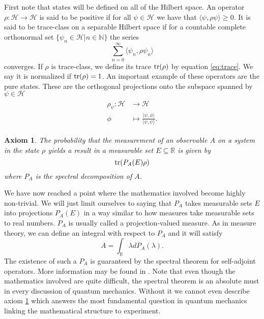 \documentclass{article}
\newtheorem{axiom}{Axiom}
\begin{document}
First note that states will be defined on all of the Hilbert space. An operator $\rho:\mathcal{H}\rightarrow\mathcal{H}$ is said to be positive if for all $\psi\in\mathcal{H}$ we have that $\langle\psi,\rho\psi\rangle\geq 0$. It is said to be trace-class on a separable Hilbert space if for a countable complete orthonormal set $\{\psi_n\in\mathcal{H}|n\in\mathbb{N}\}$ the series
\begin{equation}\label{eq:trace}
\sum_{n=0}^\infty \langle\psi_n,\rho\psi_n\rangle
\end{equation}
converges. If $\rho$ is trace-class, we define its trace $\tr(\rho)$ by equation \eqref{eq:trace}. We say it is normalized if $\tr(\rho)=1$. An important example of these operators are the pure states. These are the orthogonal projections onto the subspace spanned by $\psi\in\mathcal{H}$
\begin{align}
\begin{split}
\rho_\psi:\mathcal{H}&\rightarrow\mathcal{H}\\
\phi&\mapsto\frac{\langle\psi,\phi\rangle}{\langle\psi,\psi\rangle}.
\end{split}
\end{align}

\begin{axiom}\label{ax:probability}
The probability that the measurement of an observable $A$ on a system in the state $\rho$ yields a result in a measurable set $E\subseteq \mathbb{R}$ is given by
\begin{equation}
\tr(P_A(E)\rho)
\end{equation}
where $P_A$ is the spectral decomposition of $A$.
\end{axiom}

We have now reached a point where the mathematics involved become highly non-trivial. We will just limit ourselves to saying that $P_A$ takes measurable sets $E$ into projections $P_A(E)$ in a way similar to how measures take measurable sets to real numbers. $P_A$ is usually called a projection-valued measure. As in measure theory, we can define an integral with respect to $P_A$ and it will satisfy
\begin{equation}
A=\int_\mathbb{R} \lambda dP_A(\lambda).
\end{equation} 
The existence of such a $P_A$ is guaranteed by the spectral theorem for self-adjoint operators. More information may be found in \cite{Hall2013}. Note that even though the mathematics involved are quite difficult, the spectral theorem is an absolute must in every discussion of quantum mechanics. Without it we cannot even describe axiom \ref{ax:probability} which answers the most fundamental question in quantum mechanics linking the mathematical structure to experiment.
\end{document}
